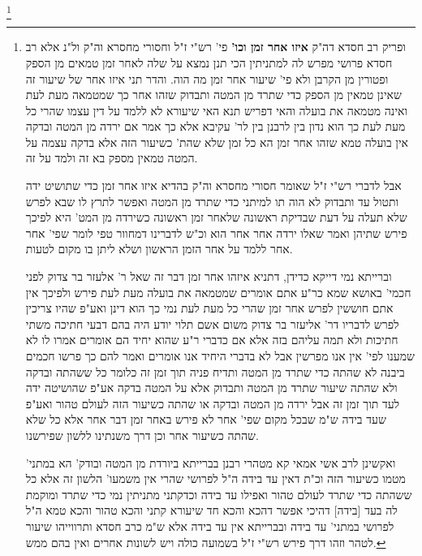 \documentclass[12pt, openany]{book}
\newcommand{\footnotecomment}[1]{\footnote{#1}}
\newcommand{\commenta}[1]{\footnotecomment{#1}}
\begin{document}
{\commenta{ ופריק רב חסדא דה"ק \textbf{איזו אחר זמן וכו'}  פי' רש"י ז"ל וחסורי מחסרא וה"ק ול"נ אלא רב חסדא פרושי מפרש לה למתניתין הכי תנן נמצא על שלה לאחר זמן טמאים מן הספק ופטורין מן הקרבן ולא פי' שיעור אחר זמן מה הוה. והדר תני איזו אחר של שיעור זה שאינן טמאין מן הספק כדי שתרד מן המטה ותבדוק שזהו אחר כך שמטמאה מעת לעת ואינה מטמאה את בועלה והאי דפריש תנא האי שיעורא לא ללמד על דין עצמו שהרי כל מעת לעת כך הוא נדון בין לרבנן בין לר' עקיבא אלא כך אמר אם ירדה מן המטה ובדקה אין בועלה טמא שזהו אחר זמן הא כל זמן שלא שהת' כשיעור הזה אלא בדקה עצמה על המטה טמאין מספק בא זה ולמד על זה.\par  אבל לדברי רש"י ז"ל שאומר חסורי מחסרא וה"ק בהדיא איזו אחר זמן כדי שתושיט ידה ותטול עד ותבדוק לא הוה תו למיתני כדי שתרד מן המטה ואפשר לתרץ לו שבא לפרש שלא תעלה על דעת שבדיקת ראשונה שלאחר זמן ראשונה כשירדה מן המט' היא לפיכך פירש שתיהן ואמר שאלו ירדה אחר אחר הוא וכ"ש לדברינו דמחוור טפי לומר שפי' אחר אחר ללמד על אחר הזמן הראשון ושלא ליתן בו מקום לטעות.\par  וברייתא נמי דייקא כדידן, דתניא איזהו אחר זמן דבר זה שאל ר' אלעזר בר צדוק לפני חכמי' באושא שמא כר"ע אתם אומרים שמטמאה את בועלה מעת לעת פירש ולפיכך אין אתם חוששין לפרש אחר זמן שהרי כל מעת לעת נמי כך הוא דינן ואע"פ שהיו צריכין לפרש לדבריו דר' אליעזר בר צדוק משום אשם תלוי יודע היה בהם דבעי חתיכה משתי חתיכות ולא תמה עליהם בזה אלא אם כדברי ר"ע שהוא יחיד הם אומרים אמרו לו לא שמענו לפי' אין אנו מפרשין אבל לא בדברי היחיד אנו אומרים ואמר להם כך פרשו חכמים ביבנה לא שהתה כדי שתרד מן המטה ותדיח פניה תוך זמן זה כלומר כל ששהתה ובדקה ולא שהתה שיעור שתרד מן המטה ותבדוק אלא על המטה בדקה אע"פ שהושיטה ידה לעד תוך זמן זה אבל ירדה מן המטה ובדקה או שהתה כשיעור הזה לעולם טהור ואע"פ שעד בידה ש"מ שבכל מקום שפי' אחר לא פירש באחר זמן דבר אחר אלא כל שלא שהתה כשיעור אחר וכן דרך משנתינו ללשון שפירשנו.\par  ואקשינן לרב אשי אמאי קא מטהרי רבנן בברייתא ביורדת מן המטה ובודק' הא במתני' מטמו כשיעור הזה וכ"ת דאין עד בידה ה"ל לפרושי שהרי אין משמעו' הלשון זה אלא כל ששהתה כדי שתרד לעולם טהור ואפילו עד בידה וכדקתני מתניתין נמי כדי שתרד ומוקמת לה בעד [בידה] דהיכי אפשר דהכא והכא חד שיעורא קתני והכא טהור והכא טמא ה"ל לפרושי במתני' עד בידה ובברייתא אין עד בידה אלא ש"מ כרב חסדא ותרווייהו שיעור לטהר וזהו דרך פירש רש"י ז"ל בשמועה כולה ויש לשונות אחרים ואין בהם ממש. }

}
\end{document}
